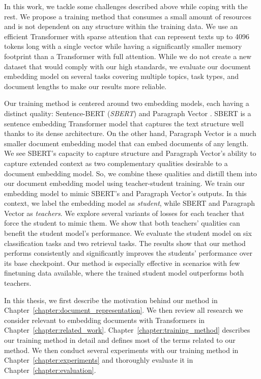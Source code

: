 In this work, we tackle some challenges described above while coping with the
rest. We propose a training method that consumes a small amount of resources
and is not dependent on any structure within the training data. We use an
efficient Transformer with sparse attention that can represent texts up to 4096
tokens long with a single vector while having a significantly smaller memory
footprint than a Transformer with full attention. While we do not create a new
dataset that would comply with our high standards, we evaluate our document
embedding model on several tasks covering multiple topics, task types, and
document lengths to make our results more reliable.

Our training method is centered around two embedding models, each having a
distinct quality: Sentence-BERT (\emph{SBERT}) \citep{reimers2019sentence} and
Paragraph Vector \citep{le2014distributed}. SBERT is a sentence embedding
Transformer model that captures the text structure well thanks to its dense
architecture. On the other hand, Paragraph Vector is a much smaller document
embedding model that can embed documents of any length. We see SBERT's capacity
to capture structure and Paragraph Vector's ability to capture extended context
as two complementary qualities desirable to a document embedding model. So, we
combine these qualities and distill them into our document embedding model
using teacher-student training. We train our embedding model to mimic SBERT's
and Paragraph Vector's outputs. In this context, we label the embedding model
as \emph{student}, while SBERT and Paragraph Vector as \emph{teachers}. We
explore several variants of losses for each teacher that force the student to
mimic them. We show that both teachers' qualities can benefit the student
model's performance. We evaluate the student model on six classification tasks
and two retrieval tasks. The results show that our method performs consistently
and significantly improves the students' performance over its base checkpoint.
Our method is especially effective in scenarios with few finetuning data
available, where the trained student model outperforms both teachers.

In this thesis, we first describe the motivation behind our method in
Chapter~\ref{chapter:document_representation}. We then review all research we
consider relevant to embedding documents with Transformers in
Chapter~\ref{chapter:related_work}. Chapter~\ref{chapter:training_method}
describes our training method in detail and defines most of the terms related
to our method. We then conduct several experiments with our training method in
Chapter~\ref{chapter:experiments} and thoroughly evaluate it in
Chapter~\ref{chapter:evaluation}.

